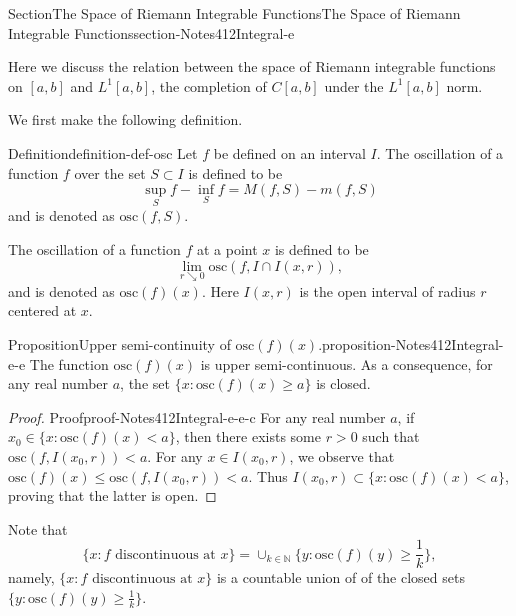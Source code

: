 \documentclass[oneside,10pt,]{article}
\numberwithin{equation}{section}
\newcommand{\bbN}{\mathbb{N}}
\newcommand{\osc}{\text{osc}}
\begin{document}
\begin{sectionptx}{Section}{The Space of Riemann Integrable Functions}{}{The Space of Riemann Integrable Functions}{}{}{section-Notes412Integral-e}
\begin{introduction}{}%
Here we discuss the relation between the space of Riemann integrable functions on \([a, b]\) and \(L^{1}[a, b]\), the completion of \(C[a, b]\) under the \(L^{1}[a, b]\) norm.\end{introduction}%
We first make the following definition.%
\begin{definition}{Definition}{}{definition-def-osc}%
%
\label{notation-def-osc-b}%
Let \(f\) be defined on an interval \(I\). The oscillation of a function \(f\) over the set \(S \subset I\) is defined to be%
\begin{equation*}
\sup_{S}f - \inf_{S}f = M(f, S)-m(f, S)
\end{equation*}
and is denoted as \(\osc(f, S)\).%
\par
The oscillation of a function \(f\)  at a point \(x\) is defined to be%
\begin{equation*}
\lim_{r\searrow 0} \osc(f, I\cap I(x, r)),
\end{equation*}
and is denoted as \(\osc(f)(x)\). Here \(I(x, r)\) is the open interval of radius \(r\) centered at \(x\).%
\end{definition}
\begin{proposition}{Proposition}{Upper semi-continuity of \(\osc(f)(x)\).}{}{proposition-Notes412Integral-e-e}%
The function \(\osc(f)(x)\) is upper 	semi-continuous. As a consequence, for any real number \(a\), the set \(\{x: 	\osc(f)(x)\ge a \}\) is closed.\end{proposition}
\begin{proof}{Proof}{}{proof-Notes412Integral-e-e-c}
For any real number \(a\), if \(x_{0}\in \{x: 	\osc(f)(x) < a\}\), then there exists some \(r>0\) such that \(\osc(f, I(x_{0}, r)) < a\). For any \(x \in I(x_{0}, r)\), we observe that \(\osc(f)(x)\le \osc(f, I(x_{0}, r)) < a\). Thus \(I(x_{0}, r) \subset \{x: 	\osc(f)(x) < a\}\), proving that the latter is open.%
\end{proof}
Note that%
\begin{equation}
\{x: f \text{ discontinuous at } x\}=
\cup_{k\in \bbN} \{y: \osc(f)(y)\ge \frac 1k\},\label{men-eqn-discont}
\end{equation}
namely, \(\{x: f \text{ discontinuous at } x\}\) is a countable union of of the closed sets \(\{y: \osc(f)(y)\ge \frac 1k\}\).%

\end{sectionptx}
\end{document}

